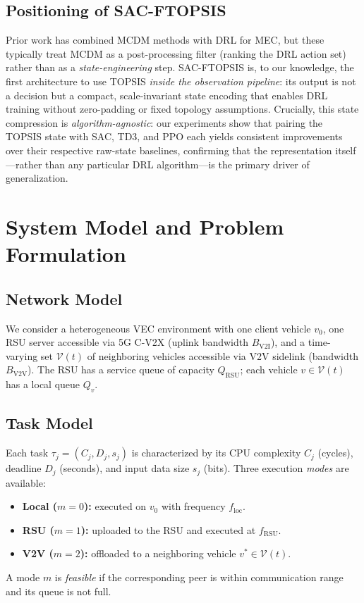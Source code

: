 \documentclass[iicol]{sn-jnl}
\begin{document}
\subsection{Positioning of SAC-FTOPSIS}

Prior work has combined MCDM methods with DRL for MEC, but these typically
treat MCDM as a post-processing filter (ranking the DRL action set) rather than
as a \emph{state-engineering} step.
SAC-FTOPSIS is, to our knowledge, the first architecture to use TOPSIS
\emph{inside the observation pipeline}: its output is not a decision but a
compact, scale-invariant state encoding that enables DRL training without
zero-padding or fixed topology assumptions.
Crucially, this state compression is \emph{algorithm-agnostic}: our experiments
show that pairing the TOPSIS state with SAC, TD3, and PPO each yields
consistent improvements over their respective raw-state baselines, confirming
that the representation itself—rather than any particular DRL algorithm—is the
primary driver of generalization.

\section{System Model and Problem Formulation}
\label{sec:model}

\subsection{Network Model}

We consider a heterogeneous VEC environment with one client vehicle $v_0$, one
RSU server accessible via 5G C-V2X (uplink bandwidth $B_{\mathrm{V2I}}$), and
a time-varying set $\mathcal{V}(t)$ of neighboring vehicles accessible via V2V
sidelink (bandwidth $B_{\mathrm{V2V}}$).
The RSU has a service queue of capacity $Q_{\mathrm{RSU}}$; each vehicle
$v \in \mathcal{V}(t)$ has a local queue $Q_v$.

\subsection{Task Model}

Each task $\tau_j = (C_j, D_j, s_j)$ is characterized by its CPU complexity
$C_j$ (cycles), deadline $D_j$ (seconds), and input data size $s_j$ (bits).
Three execution \emph{modes} are available:
\begin{itemize}[nosep,leftmargin=*]
  \item \textbf{Local ($m=0$):} executed on $v_0$ with frequency $f_{\mathrm{loc}}$.
  \item \textbf{RSU ($m=1$):} uploaded to the RSU and executed at $f_{\mathrm{RSU}}$.
  \item \textbf{V2V ($m=2$):} offloaded to a neighboring vehicle $v^* \in \mathcal{V}(t)$.
\end{itemize}
A mode $m$ is \emph{feasible} if the corresponding peer is within communication
range and its queue is not full.
\end{document}
